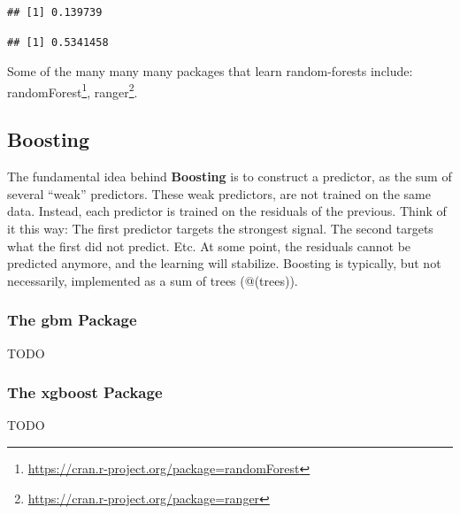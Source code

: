 \documentclass[]{book}
\newenvironment{Shaded}{\begin{snugshade}}{\end{snugshade}}
\newcommand{\CommentTok}[1]{\textcolor[rgb]{0.56,0.35,0.01}{\textit{#1}}}
\newcommand{\DataTypeTok}[1]{\textcolor[rgb]{0.13,0.29,0.53}{#1}}
\newcommand{\FloatTok}[1]{\textcolor[rgb]{0.00,0.00,0.81}{#1}}
\newcommand{\KeywordTok}[1]{\textcolor[rgb]{0.13,0.29,0.53}{\textbf{#1}}}
\newcommand{\NormalTok}[1]{#1}
\newcommand{\OperatorTok}[1]{\textcolor[rgb]{0.81,0.36,0.00}{\textbf{#1}}}
\newcommand{\StringTok}[1]{\textcolor[rgb]{0.31,0.60,0.02}{#1}}
\renewcommand{\href}[2]{#2\footnote{\url{#1}}}
\theoremstyle{definition}
\theoremstyle{definition}
\theoremstyle{definition}
\theoremstyle{remark}
\begin{document}
\begin{verbatim}
## [1] 0.139739
\end{verbatim}

\begin{Shaded}
\end{Shaded}

\begin{verbatim}
## [1] 0.5341458
\end{verbatim}

Some of the many many many packages that learn random-forests include: \href{https://cran.r-project.org/package=randomForest}{randomForest}, \href{https://cran.r-project.org/package=ranger}{ranger}.

\hypertarget{boosting}{%
\subsection{Boosting}\label{boosting}}

The fundamental idea behind \textbf{Boosting} is to construct a predictor, as the sum of several ``weak'' predictors.
These weak predictors, are not trained on the same data.
Instead, each predictor is trained on the residuals of the previous.
Think of it this way:
The first predictor targets the strongest signal.
The second targets what the first did not predict.
Etc.
At some point, the residuals cannot be predicted anymore, and the learning will stabilize.
Boosting is typically, but not necessarily, implemented as a sum of trees (@(trees)).

\hypertarget{the-gbm-package}{%
\subsubsection{The gbm Package}\label{the-gbm-package}}

TODO

\hypertarget{the-xgboost-package}{%
\subsubsection{The xgboost Package}\label{the-xgboost-package}}

TODO
\end{document}
